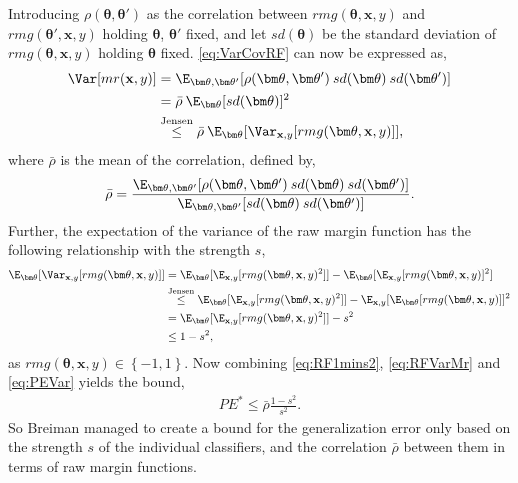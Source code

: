 Introducing $\rho(\bm \theta, \bm \theta')$ as the correlation between $rmg(\bm \theta, \mathbf{x}, y)$ and $rmg(\bm \theta', \mathbf{x}, y)$ holding $\bm \theta$, $\bm \theta'$ fixed, and let $sd(\bm \theta)$ be the standard deviation of $rmg(\bm \theta, \mathbf{x}, y)$ holding $\bm \theta$ fixed. \eqref{eq:VarCovRF} can now be expressed as,
\begin{align}
  \Var[mr(\mathbf{x}, y)] 
  &= \E_{\bm \theta, \bm \theta'}[\rho(\bm \theta, \bm \theta') \: sd(\bm \theta) \: sd(\bm \theta')] \notag \\
  &= \bar \rho \: \E_{\bm \theta}[sd(\bm \theta)]^2 \notag \\
  \label{eq:RFVarMr} 
  &\overset{\text{Jensen}}{\leq}  \bar \rho \: \E_{\bm \theta}[\Var_{\mathbf{x}, y}[rmg(\bm \theta, \mathbf{x}, y)]],
\end{align}
where $\bar \rho$ is the mean of the correlation, defined by,
\begin{align}
  \bar \rho = 
  \frac{\E_{\bm \theta, \bm \theta'}[\rho(\bm \theta, \bm \theta') \: sd(\bm \theta) \: sd(\bm \theta')]}
  {\E_{\bm \theta, \bm \theta'}[sd(\bm \theta) \: sd(\bm \theta')]}.
\end{align}
Further, the expectation of the variance of the raw margin function has the following relationship with the strength $s$,
\begin{align}
  \E_{\bm \theta}[\Var_{\mathbf{x}, y}[rmg(\bm \theta, \mathbf{x}, y)]] 
  &= \E_{\bm \theta}[\E_{\mathbf{x}, y}[rmg(\bm \theta, \mathbf{x}, y)^2]] - \E_{\bm \theta}[\E_{\mathbf{x}, y}[rmg(\bm \theta, \mathbf{x}, y)]^2] \notag \\
  &\overset{\text{Jensen}}{\leq}
  \E_{\bm \theta}[\E_{\mathbf{x}, y}[rmg(\bm \theta, \mathbf{x}, y)^2]] - \E_{\mathbf{x}, y}[\E_{\bm \theta}[rmg(\bm \theta, \mathbf{x}, y)]]^2 \notag \\
  &= \E_{\bm \theta}[\E_{\mathbf{x}, y}[rmg(\bm \theta, \mathbf{x}, y)^2]] - s^2 \notag \\
  \label{eq:RF1mins2} 
  &\leq 1 - s^2,
\end{align}
as $rmg(\bm \theta, \mathbf{x}, y) \in \left\{ -1, 1 \right\}$. Now combining \eqref{eq:RF1mins2}, \eqref{eq:RFVarMr} and \eqref{eq:PEVar} yields the bound,
\begin{align}
  PE^* \leq \bar \rho  \frac{1 - s^2}{s^2} .
\end{align}
So Breiman managed to create a bound for the generalization error only based on the strength $s$ of the individual classifiers, and the correlation $\bar \rho$ between them in terms of raw margin functions. 

